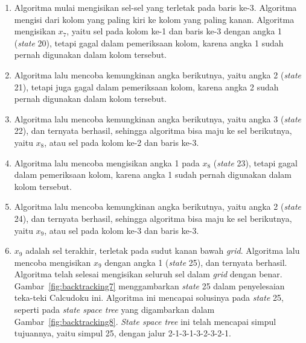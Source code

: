 \documentclass[a4paper,twoside]{article}
\begin{document}
\begin{enumerate}
\begin{enumerate}
\item Algoritma mulai mengisikan sel-sel yang terletak pada baris ke-3. Algoritma mengisi dari kolom yang paling kiri ke kolom yang paling kanan. Algoritma mengisikan \begin{math}x_7\end{math}, yaitu sel pada kolom ke-1 dan baris ke-3 dengan angka 1 (\textit{state} 20), tetapi gagal dalam pemeriksaan kolom, karena angka 1 sudah pernah digunakan dalam kolom tersebut.
\item Algoritma lalu mencoba kemungkinan angka berikutnya, yaitu angka 2 (\textit{state} 21), tetapi juga gagal dalam pemeriksaan kolom, karena angka 2 sudah pernah digunakan dalam kolom tersebut.
\item Algoritma lalu mencoba kemungkinan angka berikutnya, yaitu angka 3 (\textit{state} 22), dan ternyata berhasil, sehingga algoritma bisa maju ke sel berikutnya, yaitu \begin{math}x_8\end{math}, atau sel pada kolom ke-2 dan baris ke-3.
\item Algoritma lalu mencoba mengisikan angka 1 pada \begin{math}x_8\end{math} (\textit{state} 23), tetapi gagal dalam pemeriksaan kolom, karena angka 1 sudah pernah digunakan dalam kolom tersebut.
\item Algoritma lalu mencoba kemungkinan angka berikutnya, yaitu angka 2 (\textit{state} 24), dan ternyata berhasil, sehingga algoritma bisa maju ke sel berikutnya, yaitu \begin{math}x_9\end{math}, atau sel pada kolom ke-3 dan baris ke-3.
\item \begin{math}x_9\end{math} adalah sel terakhir, terletak pada sudut kanan bawah \textit{grid}. Algoritma lalu mencoba mengisikan \begin{math}x_9\end{math} dengan angka 1 (\textit{state} 25), dan ternyata berhasil. Algoritma telah selesai mengisikan seluruh sel dalam \textit{grid} dengan benar. Gambar~\ref{fig:backtracking7} menggambarkan \textit{state} 25 dalam penyelesaian teka-teki Calcudoku ini. Algoritma ini mencapai solusinya pada \textit{state} 25, seperti pada \textit{state space tree} yang digambarkan dalam Gambar~\ref{fig:backtracking8}. \textit{State space tree} ini telah mencapai simpul tujuannya, yaitu simpul 25, dengan jalur 2-1-3-1-3-2-3-2-1.


\end{enumerate}
\end{enumerate}
\end{document}
